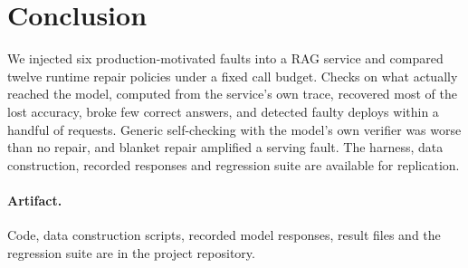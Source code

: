 \section{Conclusion}
We injected six production-motivated faults into a RAG service and compared twelve runtime repair
policies under a fixed call budget. Checks on what actually reached the model, computed from the
service's own trace, recovered most of the lost accuracy, broke few correct answers, and detected
faulty deploys within a handful of requests. Generic self-checking with the model's own verifier
was worse than no repair, and blanket repair amplified a serving fault. The harness, data
construction, recorded responses and regression suite are available for replication.

\paragraph{Artifact.} Code, data construction scripts, recorded model responses, result files and
the regression suite are in the project repository.
